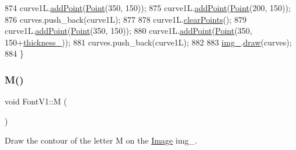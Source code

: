 \begin{DoxyCode}
874     curve1L.\mbox{\hyperlink{class_bezier_curve_a38d16c18b36ae45619b05e26e226cf34}{addPoint}}(\mbox{\hyperlink{class_point}{Point}}(350, 150));
875     curve1L.\mbox{\hyperlink{class_bezier_curve_a38d16c18b36ae45619b05e26e226cf34}{addPoint}}(\mbox{\hyperlink{class_point}{Point}}(200, 150));
876     curves.push\_back(curve1L);
877 
878     curve1L.\mbox{\hyperlink{class_bezier_curve_a0ba8ce66d5af5971ae6a1b506029728e}{clearPoints}}();
879     curve1L.\mbox{\hyperlink{class_bezier_curve_a38d16c18b36ae45619b05e26e226cf34}{addPoint}}(\mbox{\hyperlink{class_point}{Point}}(350, 150));
880     curve1L.\mbox{\hyperlink{class_bezier_curve_a38d16c18b36ae45619b05e26e226cf34}{addPoint}}(\mbox{\hyperlink{class_point}{Point}}(350, 150+\mbox{\hyperlink{class_font_v1_aed8040e76be9a52833627b92f0fb4e5f}{thickness\_}}));
881     curves.push\_back(curve1L);
882 
883     \mbox{\hyperlink{class_font_v1_a00569e3e3c4b70f437b63f396f735fb0}{img\_}}.\mbox{\hyperlink{class_image_a8d162f3cab956131d58708c09aa560b0}{draw}}(curves);
884 \}
\end{DoxyCode}
\mbox{\label{class_font_v1_a69afdf545ed6bccbb31efaef5d6d4219}} 
\subsubsection{\texorpdfstring{M()}{M()}}
{\footnotesize\ttfamily void Font\+V1\+::M (\begin{DoxyParamCaption}{ }\end{DoxyParamCaption})}



Draw the contour of the letter M on the \mbox{\hyperlink{class_image}{Image}} img\+\_\+. 


